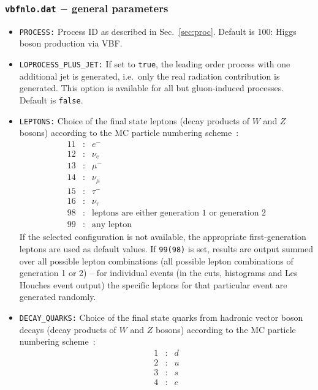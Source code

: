 \documentclass[english,12pt]{article}
\begin{document}
\subsubsection{{\tt vbfnlo.dat} $-$ general parameters}
\label{sec:general}
\begin{itemize}
\item {\tt PROCESS:} Process ID as described in Sec.~\ref{sec:proc}.  Default is
100: Higgs boson production via VBF.

\item {\tt LOPROCESS\_PLUS\_JET:} If set to {\tt true}, the leading order
  process with one additional jet is generated, i.e.\ only the real radiation
  contribution is generated.  This option is available for all but gluon-induced processes.  
  Default is {\tt false}.
\item{\tt LEPTONS:} Choice of the final state leptons (decay products of $W$ and
$Z$ bosons) according to the MC particle numbering scheme~\cite{Amsler:2008zz}:
\begin{eqnarray}
11 &:& e^{-} \nonumber \\
12 &:& \nu_{e} \nonumber \\ 
13 &:& \mu^{-} \nonumber \\
14 &:& \nu_{\mu} \nonumber \\ 
15 &:& \tau^{-} \nonumber \\
16 &:& \nu_{\tau} \nonumber \\
98 &:& \mbox{leptons are either generation 1 or generation 2} \nonumber \\
99 &:& \mbox{any lepton} \nonumber
\end{eqnarray}
If the selected configuration is not available, the appropriate first-generation
leptons are used as default values.  If {\tt 99(98)} is set, results are output
summed over all possible lepton combinations (all possible lepton combinations
of generation 1 or 2) -- for individual events (in the cuts, histograms and Les
Houches event output) the specific leptons for that particular event are
generated randomly.  
\item{\tt DECAY\_QUARKS:} Choice of the final state quarks from hadronic vector boson decays
(decay products of $W$ and $Z$ bosons) according to the MC particle numbering scheme~\cite{Amsler:2008zz}:
\begin{eqnarray}
1 &:& d \nonumber \\
2 &:& u \nonumber \\ 
3 &:& s \nonumber \\
4 &:& c \nonumber \\ 

\end{eqnarray}
\end{itemize}
\end{document}
